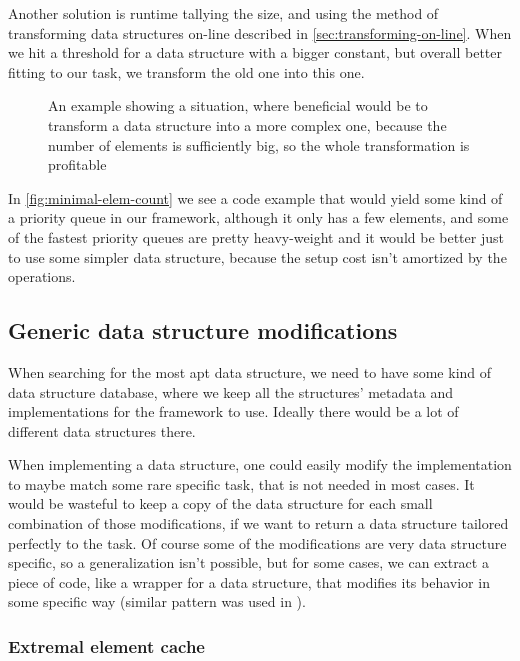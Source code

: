 \documentclass[a4paper,11pt]{article}
\begin{document}
		Another solution is runtime tallying the size, and using the method of transforming data structures
		on-line described in \autoref{sec:transforming-on-line}. When we hit a threshold for a data structure
		with a bigger constant, but overall better fitting to our task, we transform the old one into this one.

		\begin{figure}
			

			\caption{An example showing a situation, where beneficial would be to transform a data structure
				into a more complex one, because the number of elements is sufficiently big, so the
				whole transformation is profitable}

			\label{fig:minimal-elem-count}
		\end{figure}

        In \autoref{fig:minimal-elem-count} we see a code example that would yield some kind of a priority queue in our
        framework, although it only has a few elements, and some of the fastest priority queues are pretty heavy-weight
        and it would be better just to use some simpler data structure, because the setup cost isn't amortized by the
        operations.

	\subsection{Generic data structure modifications} \label{sub:gdsm}

		When searching for the most apt data structure, we need to have some kind of data structure database,
		where we keep all the structures' metadata and implementations for the framework to use. Ideally there
		would be a lot of different data structures there.

		When implementing a data structure, one could easily modify the implementation to maybe match some rare
		specific task, that is not needed in most cases. It would be wasteful to keep a copy of the data
		structure for each small combination of those modifications, if we want to return a data structure
		tailored perfectly to the task. Of course some of the modifications are very data structure specific, so
		a generalization isn't possible, but for some cases, we can extract a piece of code, like a wrapper for
        a data structure, that modifies its behavior in some specific way (similar pattern was used in
        \cite{Okasaki}).

		\subsubsection{Extremal element cache}
\end{document}
